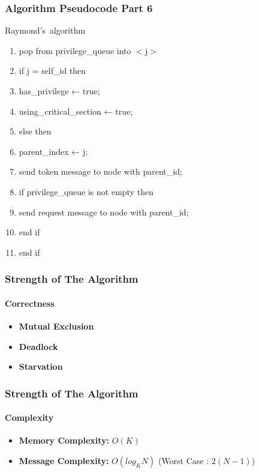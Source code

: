 \documentclass[11pt]{beamer}              %
\begin{document}
\begin{frame}
\frametitle{Algorithm Pseudocode Part 6}

\begin{center}
\begin{algorithm}[H]
	\scriptsize
	\def\algorithmlabel{Raymond's}
    \caption{\algorithmlabel\ algorithm}
    \label{alg:raymondsalgorithm}
    \begin{algorithmic}[1]
            \begin{enumerate}
                \item pop from privilege\_queue into $<$j$>$
                \item if j = self\_id then
                \item \quad has\_privilege ← true;
                \item \quad using\_critical\_section ← true;
                \item else then
                \item \quad parent\_index ← j;
                \item \quad send token message to node with parent\_id;
                \item \quad if privilege\_queue is not empty then
                \item \quad \quad send request message to node with parent\_id;
                \item \quad end if
                \item end if
            \end{enumerate}

    \end{algorithmic}
\end{algorithm}
\end{center}
\end{frame}

\begin{frame}
\frametitle{Strength of The Algorithm}
\framesubtitle{Correctness}
\begin{itemize}
    \item \textbf{Mutual Exclusion}
    \item \textbf{Deadlock}
    \item \textbf{Starvation}
\end{itemize}
\end{frame}

\begin{frame}
\frametitle{Strength of The Algorithm}
\framesubtitle{Complexity}
\begin{itemize}
    \item \textbf{Memory Complexity:} $O(K)$
    \item \textbf{Message Complexity:} $O(log_{K}N)$ (Worst Case : $2(N-1)$)
\end{itemize}
\end{frame}
\end{document}
